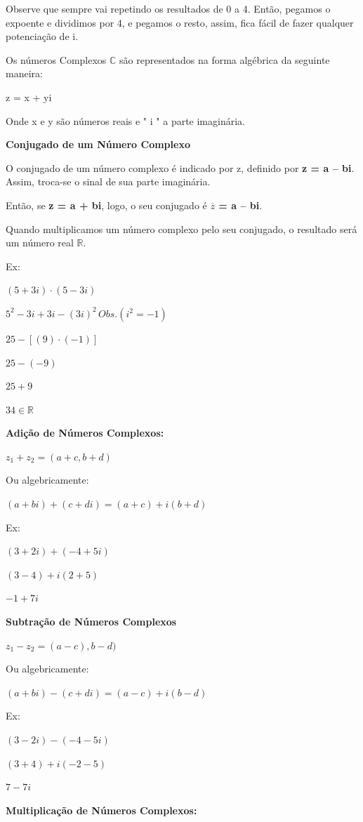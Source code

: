 \begin{multicols*}{2}
	Observe que sempre vai repetindo os resultados de 0 a 4. Então, pegamos o expoente e dividimos por 4, e pegamos o resto, assim, fica fácil de fazer qualquer potenciação de i.

	Os números Complexos $\mathbb{C}$ são representados na forma algébrica da seguinte maneira:

	z = x + yi

	Onde x e y são números reais e " i " a parte imaginária.

	\textbf{Conjugado de um Número Complexo}

	O conjugado de um número complexo é indicado por z, definido por \textbf{\color{blue}z = a – bi}. Assim, troca-se o sinal de sua parte imaginária.

	Então, se \textbf{\color{blue}z = a + bi}, logo, o seu conjugado é \textbf{\color{blue}$\overline{z}$ = a – bi}.

	Quando multiplicamos um número complexo pelo seu conjugado, o resultado será um número real $\mathbb{R}$.

	Ex:

	$ (5 + 3i) \cdot (5 - 3i) $

	$ 5^2 - 3i + 3i - (3i)^2 \, Obs. (i^2 = -1)$

	$ 25 - [(9) \cdot (-1)] $

	$ 25 - (-9)$

	$ 25 + 9 $

	$ 34 \in \mathbb{R}$

	\textbf{Adição de Números Complexos:}

	$ z_1 + z_2 = ( a + c, b + d)$

	Ou algebricamente:

	$(a + bi) + (c + di) = (a + c) + i(b + d)$

	Ex:

	$(3 + 2i) + (-4 + 5i)$

	$(3 - 4) + i(2 + 5)$

	$ -1 + 7i$

	\textbf{Subtração de Números Complexos}

	$z_1 - z_2 = (a -c), b -d)$

	Ou algebricamente:

	$(a + bi) - (c + di) = (a - c) + i(b - d)$

	Ex:

	$(3 - 2i) - (-4 - 5i)$

	$(3 + 4) + i(-2 - 5)$

	$ 7 - 7i$

	\textbf{Multiplicação de Números Complexos:}


\end{multicols*}
